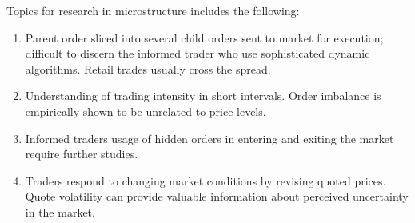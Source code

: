 Topics for research in microstructure includes the following:
\begin{enumerate}[label=\roman*.]
\setlength{\itemsep}{0pt}
\item Parent order sliced into several child orders sent to market for execution; difficult to discern the informed trader who use sophisticated dynamic algorithms. Retail trades usually cross the spread.
\item Understanding of trading intensity in short intervals. Order imbalance is empirically shown to be unrelated to price levels.
\item Informed traders usage of hidden orders in entering and exiting the market require further studies.
\item Traders respond to changing market conditions by revising quoted prices. Quote volatility can provide valuable information about perceived uncertainty in the market.
\end{enumerate}
